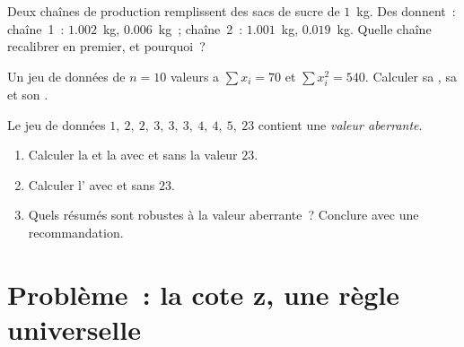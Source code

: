 \begin{exercise}[$\star\star$]\label{exo:g11:stat:8}
Deux chaînes de production remplissent des sacs de sucre de $1$~kg. Des
 donnent~: chaîne~1~:  $1.002$~kg, 
$0.006$~kg~; chaîne~2~:  $1.001$~kg,  $0.019$~kg.
Quelle chaîne recalibrer en premier, et pourquoi~?
\end{exercise}

\begin{exercise}[$\star\star$]\label{exo:g11:stat:9}
Un jeu de données de $n = 10$ valeurs a $\sum x_i = 70$ et
$\sum x_i^2 = 540$. Calculer sa , sa  et son .
\end{exercise}

\begin{exercise}[$\star\star\star$]\label{exo:g11:stat:10}
Le jeu de données $1,\ 2,\ 2,\ 3,\ 3,\ 3,\ 4,\ 4,\ 5,\ 23$ contient une
\emph{valeur aberrante}.
\begin{enumerate}
  \item Calculer la  et la  avec et sans la valeur $23$.
  \item Calculer l' avec et sans $23$.
  \item Quels résumés sont robustes à la valeur aberrante~? Conclure
        avec une recommandation.
\end{enumerate}
\end{exercise}

\section{Problème~: la cote z, une règle universelle}

